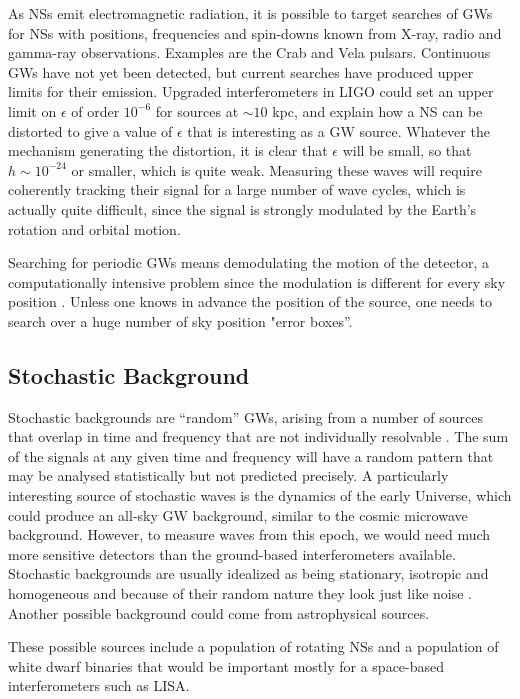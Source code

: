 \documentclass[binding=0.6cm, LaM]{sapthesis}
\begin{document}
	As NSs emit electromagnetic radiation, 
	it is possible to target searches of GWs for NSs with positions, 
	frequencies and spin-downs known from X-ray, radio and gamma-ray observations. 
	Examples are the Crab and Vela pulsars. 
	Continuous GWs have not yet been detected, 
	but current searches have produced upper limits for their emission. 
	Upgraded interferometers in LIGO could set an upper limit on  
	$\epsilon$ of order $10^{-6}$ for sources at $\sim10$ kpc, 
	and explain how a NS can be distorted to give a value of $\epsilon$ that is interesting as a GW source. 
	Whatever the mechanism generating the distortion, 
	it is clear that  $\epsilon$ will be small,
	so that $h \sim 10^{-24}$ or smaller, which is quite weak. 
	Measuring these waves will require
	coherently tracking their signal for a large number of wave cycles, 
	which is actually quite difficult, 
	since the signal is strongly modulated by the Earth’s rotation and orbital motion.

	Searching for periodic GWs means demodulating the motion of the detector, 
	a computationally intensive problem since the modulation is different for every sky position \cite{4}. 
	Unless one knows in advance the position of the source, 
	one needs to search over a huge number of sky position "error boxes”.

\subsection{Stochastic Background}
	Stochastic backgrounds are “random” GWs, 
	arising from a  number of sources that overlap 
	in time and frequency that are not individually resolvable \cite{22}. 
	The sum of the signals at any given time and frequency will have 
	a random pattern that may be analysed statistically but not predicted precisely.
	A particularly interesting source of stochastic waves is the dynamics of the early Universe, 
	which could produce an all-sky GW background, 
	similar to the cosmic microwave background.
	However, to measure waves from this epoch, 
	we would need much more sensitive detectors than the ground-based interferometers available.
	Stochastic backgrounds are usually idealized as being stationary, 
	isotropic and homogeneous and because of their random nature they look just like noise \cite{4}.	
	Another possible background could come from astrophysical sources.

	These possible sources include a population of rotating NSs 
	and a population of white dwarf binaries that would be important mostly for a space-based interferometers such as LISA. 
\end{document}
